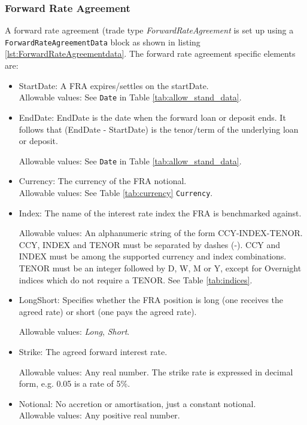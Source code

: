 \subsubsection{Forward Rate Agreement}

A forward rate agreement (trade type \emph{ForwardRateAgreement} is set up using a \\
{\tt ForwardRateAgreementData} block as shown in listing \ref{lst:ForwardRateAgreementdata}. The forward rate agreement specific elements
are:

\begin{itemize}
\item StartDate: A FRA expires/settles on the startDate. \\

Allowable values:  See \lstinline!Date! in Table \ref{tab:allow_stand_data}.

\item EndDate: EndDate is the date when the forward loan or deposit ends. It follows that (EndDate - StartDate) is the tenor/term of the underlying loan or deposit.

Allowable values:  See \lstinline!Date! in Table \ref{tab:allow_stand_data}.
\item Currency: The currency of the FRA notional. \\

Allowable values:  See Table \ref{tab:currency} \lstinline!Currency!.	
\item Index: The name of the interest rate index the FRA is benchmarked against.

  Allowable values: An alphanumeric string of the form CCY-INDEX-TENOR. CCY, INDEX and TENOR must be separated by dashes (-). CCY and INDEX must be among the supported currency and index combinations. TENOR must be an integer followed by D, W,
  M or Y, except for Overnight indices which do not require a TENOR. See Table \ref{tab:indices}.
    
\item LongShort: Specifies whether the FRA position is long (one receives the agreed rate) or short (one pays the agreed rate).

Allowable values: \emph{Long}, \emph{Short}.
\item Strike: The agreed forward interest rate.

Allowable values: Any  real number. The strike rate is
  expressed in decimal form, e.g. 0.05 is a rate of 5\%.
\item Notional: No accretion or amortisation, just a constant notional. \\
Allowable values:  Any positive real number.
\end{itemize}


